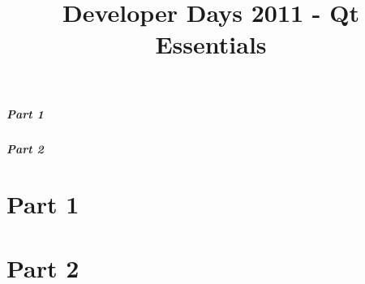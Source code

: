 \documentclass[t]{beamer}
\title{Developer Days 2011 - Qt Essentials}
\begin{document}


\begin{frame}
  \frametitle{Part 1}
  \tableofcontents[part=1]
\end{frame}

\begin{frame}
  \frametitle{Part 2}
  \tableofcontents[part=2]
\end{frame}

\part{Part 1}




\part{Part 2}






\end{document}
